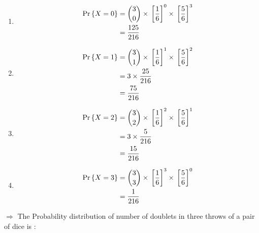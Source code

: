 \documentclass[journal,12pt,twocolumn]{IEEEtran}
\begin{document}
\begin{enumerate}[label=(\roman*)]
\item {
\begin{align}
\Pr\left\{X = 0\right\} & = {3 \choose 0} \times {}\left[\frac{1}{6}\right]^0 \times {}\left[\frac{5}{6}\right]^3\\ & = \frac{125}{216}
\end{align}}

\item {
\begin{align}
\Pr\left\{X = 1\right\} & = {3 \choose 1} \times {}\left[\frac{1}{6}\right]^1 \times {}\left[\frac{5}{6}\right]^2\\ & = 3 \times \frac{25}{216}\\ & = \frac{75}{216}
\end{align}}

\item{
\begin{align}
\Pr\left\{X = 2\right\} & = {3 \choose 2} \times {}\left[\frac{1}{6}\right]^2 \times {}\left[\frac{5}{6}\right]^1\\ & = 3 \times \frac{5}{216}\\ & = \frac{15}{216}
\end{align}}

\item{ 
\begin{align}
\Pr\left\{X = 3\right\} & = {3 \choose 3} \times {}\left[\frac{1}{6}\right]^3 \times {}\left[\frac{5}{6}\right]^0\\ & = \frac{1}{216}
\end{align}}

\end{enumerate}

$\Rightarrow$ The Probability distribution of number of doublets in three throws of
a pair of dice is :

\begin{table}[ht!]
    \centering
    
    \caption{}
    \label{table:table2}
\end{table}
\end{document}
